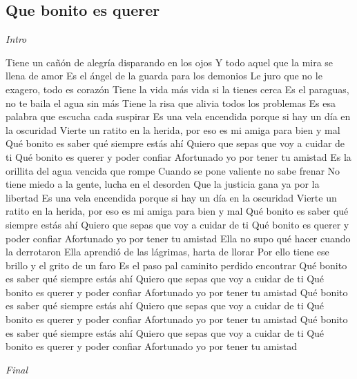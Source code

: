 \subsection{Que bonito es querer}

\noindent
\vspace{1cm}

\begin{guitar}
	\begin{multicols}{2}
		\textit{Intro}\par


Tiene un cañón de alegría disparando en los ojos
Y todo aquel que la mira se llena de amor
Es el ángel de la guarda para los demonios
Le juro que no le exagero, todo es corazón
Tiene la vida más vida si la tienes cerca
Es el paraguas, no te baila el agua sin más
Tiene la risa que alivia todos los problemas
Es esa palabra que escucha cada suspirar
Es una vela encendida porque si hay un día en la oscuridad
Vierte un ratito en la herida, por eso es mi amiga para bien y mal
Qué bonito es saber qué siempre estás ahí
Quiero que sepas que voy a cuidar de ti
Qué bonito es querer y poder confiar
Afortunado yo por tener tu amistad
Es la orillita del agua vencida que rompe
Cuando se pone valiente no sabe frenar
No tiene miedo a la gente, lucha en el desorden
Que la justicia gana ya por la libertad
Es una vela encendida porque si hay un día en la oscuridad
Vierte un ratito en la herida, por eso es mi amiga para bien y mal
Qué bonito es saber qué siempre estás ahí
Quiero que sepas que voy a cuidar de ti
Qué bonito es querer y poder confiar
Afortunado yo por tener tu amistad
Ella no supo qué hacer cuando la derrotaron
Ella aprendió de las lágrimas, harta de llorar
Por ello tiene ese brillo y el grito de un faro
Es el paso pal caminito perdido encontrar
Qué bonito es saber qué siempre estás ahí
Quiero que sepas que voy a cuidar de ti
Qué bonito es querer y poder confiar
Afortunado yo por tener tu amistad
Qué bonito es saber qué siempre estás ahí
Quiero que sepas que voy a cuidar de ti
Qué bonito es querer y poder confiar
Afortunado yo por tener tu amistad
Qué bonito es saber qué siempre estás ahí
Quiero que sepas que voy a cuidar de ti
Qué bonito es querer y poder confiar
Afortunado yo por tener tu amistad

		\par
		\textit{Final}
	\end{multicols}
\end{guitar}
